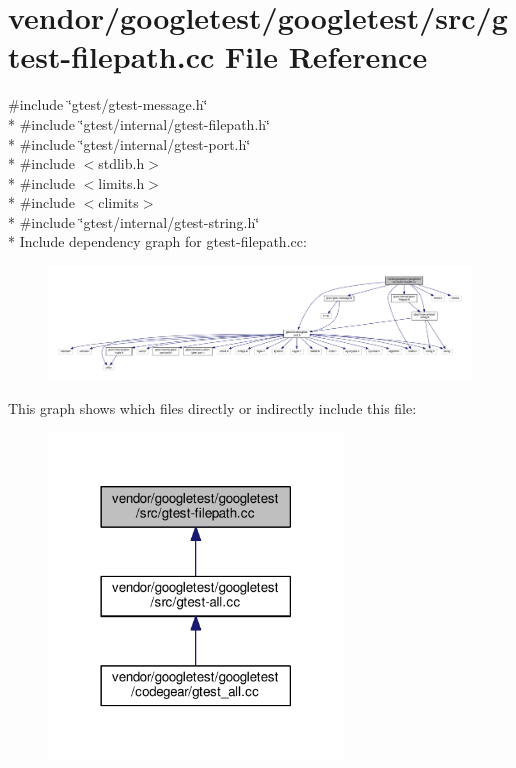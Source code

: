 \hypertarget{gtest-filepath_8cc}{}\section{vendor/googletest/googletest/src/gtest-\/filepath.cc File Reference}
\label{gtest-filepath_8cc}
{\ttfamily \#include \char`\"{}gtest/gtest-\/message.\+h\char`\"{}}\\*
{\ttfamily \#include \char`\"{}gtest/internal/gtest-\/filepath.\+h\char`\"{}}\\*
{\ttfamily \#include \char`\"{}gtest/internal/gtest-\/port.\+h\char`\"{}}\\*
{\ttfamily \#include $<$stdlib.\+h$>$}\\*
{\ttfamily \#include $<$limits.\+h$>$}\\*
{\ttfamily \#include $<$climits$>$}\\*
{\ttfamily \#include \char`\"{}gtest/internal/gtest-\/string.\+h\char`\"{}}\\*
Include dependency graph for gtest-\/filepath.cc\+:\nopagebreak
\begin{figure}[H]
\begin{center}
\leavevmode
\includegraphics[width=350pt]{gtest-filepath_8cc__incl}
\end{center}
\end{figure}
This graph shows which files directly or indirectly include this file\+:\nopagebreak
\begin{figure}[H]
\begin{center}
\leavevmode
\includegraphics[width=222pt]{gtest-filepath_8cc__dep__incl}
\end{center}
\end{figure}
